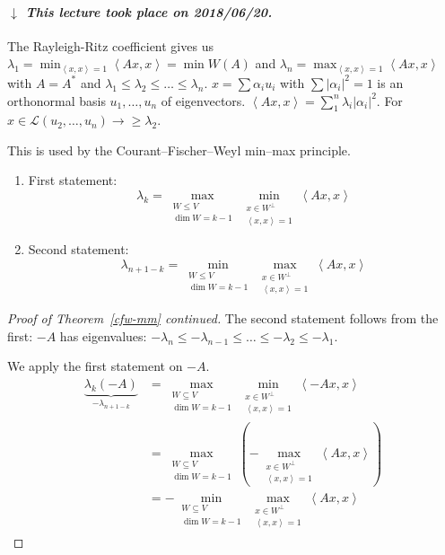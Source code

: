 \documentclass[a4paper]{article}
\numberwithin{lecref}{section}
\newcommand{\angel}[1]{\left\langle#1\right\rangle}
\newcommand{\card}[1]{\left|#1\right|}
\newcommand{\dateref}[1]{%
  \begin{mdframed}[backgroundcolor=gray!10,innerbottommargin=0pt,innertopmargin=0pt]
    \paragraph{\textit{$\downarrow$ This lecture took place on #1.}}%
  \end{mdframed}%
}
\begin{document}
\dateref{2018/06/20}

The Rayleigh-Ritz coefficient gives us $\lambda_1 = \min_{\angel{x,x} = 1} \angel{Ax, x} = \min{W(A)}$ and $\lambda_n = \max_{\angel{x,x} = 1} \angel{Ax, x}$ with $A = A^*$ and $\lambda_1 \leq \lambda_2 \leq \dots \leq \lambda_n$. $x = \sum \alpha_i u_i$ with $\sum \card{\alpha_i}^2 = 1$ is an orthonormal basis $u_1, \dots, u_n$ of eigenvectors. $\angel{Ax, x} = \sum_1^n \lambda_i \card{\alpha_i}^2$. For $x \in \mathcal L(u_2, \dots, u_n) \to \geq \lambda_2$.

This is used by the Courant--Fischer--Weyl min--max principle.

\begin{enumerate}
  \item First statement:
    \[ \lambda_k = \max_{\substack{W \leq V \\ \dim{W} = k-1}} \min_{\substack{x \in W^\bot \\ \angel{x, x} = 1}} \angel{Ax, x} \]
  \item Second statement:
    \[ \lambda_{n+1-k} = \min_{\substack{W \leq V \\ \dim{W} = k-1}} \max_{\substack{x \in W^\bot \\ \angel{x,x} = 1}} \angel{Ax, x} \]
\end{enumerate}

\begin{proof}[Proof of Theorem~\ref{cfw-mm} continued]
  The second statement follows from the first:
  $-A$ has eigenvalues: $-\lambda_n \leq -\lambda_{n-1} \leq \dots \leq -\lambda_{2} \leq -\lambda_1$.

  We apply the first statement on $-A$.
  \begin{align*}
    \underbrace{\lambda_k(-A)}_{-\lambda_{n+1-k}} &= \max_{\substack{W \subseteq V \\ \dim{W} = k-1}} \min_{\substack{x \in W^\bot \\ \angel{x, x} = 1}} \angel{-Ax, x} \\
      &= \max_{\substack{W\subseteq V \\ \dim{W} = k-1}} \left(- \max_{\substack{x \in W^\bot \\ \angel{x, x} = 1}} \angel{Ax, x}\right) \\
      &= -\min_{\substack{W \subseteq V \\ \dim{W} = k-1}} \max_{\substack{x \in W^\bot \\ \angel{x, x} = 1}} \angel{Ax, x}
  \end{align*}
\end{proof}
\end{document}
